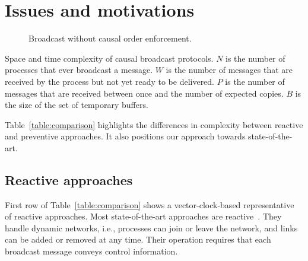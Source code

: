 
\section{Issues and motivations}
\label{sec:motivations}

\begin{figure}
  \begin{center}
  
  \caption{\label{fig:generalproblem}Broadcast without causal order
    enforcement.}
  \end{center}
\end{figure}






\begin{table}
  \caption{\label{table:comparison} Space and time complexity of causal broadcast protocols. $N$ is the number of processes that ever broadcast a message. $W$ is the number of messages that are received by the process but not yet ready to be delivered.
    $P$ is the number of messages that are received between once and the number of expected copies.
    $B$ is the size of the set of temporary buffers.}
  
\end{table}

Table~\ref{table:comparison} highlights the differences in complexity between
reactive and preventive approaches. It also positions our approach towards
state-of-the-art.

\subsection{Reactive approaches}

First row of Table~\ref{table:comparison} shows a vector-clock-based
representative~\cite{schwarz1994detecting} of reactive approaches. Most
state-of-the-art approaches are
reactive~\cite{almeida2008interval,fidge1988timestamps,hadzilacos1993fault,mattern1989virtual,mostefaoui2017probabilistic,singhal1992efficient}. They
handle dynamic networks, i.e., processes can join or leave the network, and
links can be added or removed at any time. Their operation requires that each
broadcast message conveys control information.

